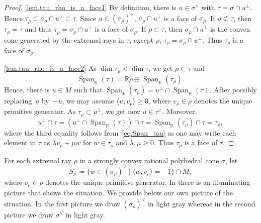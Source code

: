 \documentclass[JEP,XML,SOM,Unicode]{cedram}
\let\oldvee\vee
\renewcommand{\vee}{{\scriptscriptstyle\oldvee}}
\let\oldbot\bot
\renewcommand{\bot}{{\scriptscriptstyle\oldbot}}
\theoremstyle{plain}
\theoremstyle{definition}
\DeclareMathOperator{\Span}{Span}
\newcommand{\RR}{\mathbb{R}}
\newcommand{\set}[2]{\{#1 \mid #2\}}
\newcommand{\sprod}[2]{\langle #1, #2 \rangle}
\begin{document}
\skpt
\begin{proof}
\eqref{lem.tau_rho_is_a_face1}
By definition, there is $u \in \sigma^\vee$ with $\tau = \sigma \cap u^\bot$. Hence
$\tau_\rho \subset \sigma_\rho \cap u^\bot \subset \tau$. Since $u \in (\sigma_\rho)^\vee$,
$\sigma_\rho \cap u^\bot$ is a face of $\sigma_\rho$.
If $\rho \not\subset \tau$, then $\tau_\rho = \tau$
and thus $\tau_\rho = \sigma_\rho \cap u^\bot$ is a face of $\sigma_\rho$. If $\rho \subset \tau$,
then $\sigma_\rho \cap u^\bot$ is the convex cone generated by the extremal rays in $\tau$, except $\rho$, \ie $\tau_\rho = \sigma_\rho \cap u^\bot$. Thus $\tau_\rho$ is a face of $\sigma_\rho$.

\eqref{lem.tau_rho_is_a_face2}
As
$\dim \tau_\rho < \dim \tau$, we get $\rho \subset \tau$ and
\[
\label{eq.Span_tau}
\tag{$\boxbox$}
\Span_{\RR}(\tau) = \RR \rho \oplus \Span_{\RR}(\tau_\rho).
\]
Hence, there is $u \in M$ such that $\Span_{\RR}(\tau_\rho) = u^\bot \cap \Span_{\RR}(\tau)$.
After possibly replacing~$u$ by~$-u$, we may assume $\sprod{u}{v_\rho} \geq 0$, where
$v_\rho \in \rho$ denotes the unique primitive generator.
As $\tau_\rho \subset u^\bot$, we get now $u \in \tau^\vee$. Moreover,
\[
u^\bot \cap \tau = (u^\bot \cap \Span_{\RR}(\tau)) \cap \tau = \Span_{\RR}(\tau_\rho) \cap \tau = \tau_\rho,
\]
where the third equality follows from~\eqref{eq.Span_tau} as one may write
each element in $\tau$
as $\lambda v_{\rho} + \mu w$ for $w \in \tau_\rho$ and $\lambda, \mu \geq 0$.
Thus $\tau_\rho$ is a face of $\tau$.
\end{proof}

For each extremal ray $\rho$ in a strongly convex rational polyhedral cone $\sigma$, let
\[
S_{\rho} \coloneqq \set{w \in (\sigma_\rho)^\vee}{\sprod{w}{v_\rho} = -1} \cap M,
\]
where $v_\rho \in \rho$ denotes the unique primitive generator. In \cite[after Def.\,2.3]{Li2010Affine-Bbb-T-varie} there is an illuminating picture that shows the situation.
We provide below our own picture of the situation. In the first picture we draw $(\sigma_\rho)^\vee$
in light gray whereas in the second picture we draw $\sigma^\vee$ in light gray.\vspace*{5pt}
\end{document}
